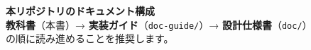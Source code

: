 \begin{titlepage}
\begin{center}
\vspace{6mm}

\begin{tcolorbox}[
  enhanced,
  colback=lightgray,
  colframe=headerblue!40,
  arc=2mm,
  width=14cm,
  before={\par\noindent},
]
    \centering
    {\bfseries 本リポジトリのドキュメント構成}\\[4pt]
    \textbf{教科書}（本書）→ \textbf{実装ガイド}（\texttt{doc-guide/}）→ \textbf{設計仕様書}（\texttt{doc/}）\\
    の順に読み進めることを推奨します。
\end{tcolorbox}

\vfill
\end{center}
\end{titlepage}
